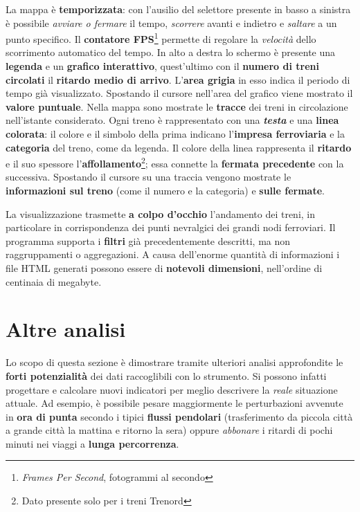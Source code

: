 \documentclass[12pt,italian]{report}
\begin{document}
La mappa è \textbf{temporizzata}: con l'ausilio del selettore presente
in basso a sinistra è possibile \textit{avviare o fermare} il tempo,
\textit{scorrere} avanti e indietro e \textit{saltare} a un punto
specifico.  Il \textbf{contatore FPS}\footnote{\textit{Frames Per
        Second}, fotogrammi al secondo} permette di regolare la
\textit{velocità} dello scorrimento automatico del tempo.  In alto a
destra lo schermo è presente una \textbf{legenda} e un \textbf{grafico
    interattivo}, quest'ultimo con il \textbf{numero di treni
    circolati} il \textbf{ritardo medio di arrivo}.  L'\textbf{area
    grigia} in esso indica il periodo di tempo già visualizzato.
Spostando il cursore nell'area del grafico viene mostrato il
\textbf{valore puntuale}.  Nella mappa sono mostrate le
\textbf{tracce} dei treni in circolazione nell'istante considerato.
Ogni treno è rappresentato con una \textbf{\textit{testa}} e una
\textbf{linea colorata}: il colore e il simbolo della prima indicano
l'\textbf{impresa ferroviaria} e la \textbf{categoria} del treno, come
da legenda.  Il colore della linea rappresenta il \textbf{ritardo} e
il suo spessore l'\textbf{affollamento}\footnote{Dato presente solo
    per i treni Trenord}; essa connette la \textbf{fermata precedente}
con la successiva.  Spostando il cursore su una traccia vengono
mostrate le \textbf{informazioni sul treno} (come il numero e la
categoria) e \textbf{sulle fermate}.

La visualizzazione trasmette \textbf{a colpo d'occhio} l'andamento dei
treni, in particolare in corrispondenza dei punti nevralgici dei
grandi nodi ferroviari.  Il programma supporta i \textbf{filtri} già
precedentemente descritti, ma non raggruppamenti o aggregazioni.  A
causa dell'enorme quantità di informazioni i file HTML generati
possono essere di \textbf{notevoli dimensioni}, nell'ordine di
centinaia di megabyte.

\section{Altre analisi}
\label{altre_analisi}

Lo scopo di questa sezione è dimostrare tramite ulteriori analisi
approfondite le \textbf{forti potenzialità} dei dati raccoglibili con
lo strumento.  Si possono infatti progettare e calcolare nuovi
indicatori per meglio descrivere la \textit{reale} situazione attuale.
Ad esempio, è possibile pesare maggiormente le perturbazioni avvenute
in \textbf{ora di punta} secondo i tipici \textbf{flussi pendolari}
(trasferimento da piccola città a grande città la mattina e ritorno la
sera) oppure \textit{abbonare} i ritardi di pochi minuti nei viaggi a
\textbf{lunga percorrenza}.
\end{document}
